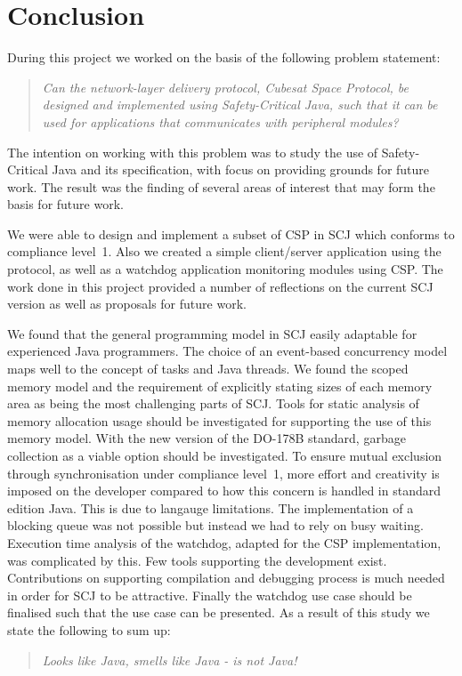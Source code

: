 \chapter{Conclusion}
\label{chapter:Conclusion}
During this project we worked on the basis of the following problem statement:
\begin{quotation}
	\textit{Can the network-layer delivery protocol, Cubesat Space Protocol, be designed and implemented using Safety-Critical Java, such that it can be used for applications that communicates with peripheral modules?}
\end{quotation}
The intention on working with this problem was to study the use of Safety-Critical Java and its specification, with focus on providing grounds for future work. The result was the finding of several areas of interest that may form the basis for future work.

We were able to design and implement a subset of CSP in SCJ which conforms to compliance level~1. Also we created a simple client/server application using the protocol, as well as a watchdog application monitoring modules using CSP. The work done in this project provided a number of reflections on the current SCJ version as well as proposals for future work.

We found that the general programming model in SCJ easily adaptable for experienced Java programmers. The choice of an event-based concurrency model maps well to the concept of tasks and Java threads. We found the scoped memory model and the requirement of explicitly stating sizes of each memory area as being the most challenging parts of SCJ. Tools for static analysis of memory allocation usage should be investigated for supporting the use of this memory model. With the new version of the DO-178B standard, garbage collection as a viable option should be investigated. To ensure mutual exclusion through synchronisation under compliance level~1, more effort and creativity is imposed on the developer compared to how this concern is handled in standard edition Java. This is due to langauge limitations. The implementation of a blocking queue was not possible but instead we had to rely on busy waiting. Execution time analysis of the watchdog, adapted for the CSP implementation, was complicated by this. Few tools supporting the development exist. Contributions on supporting compilation and debugging process is much needed in order for SCJ to be attractive. Finally the watchdog use case should be finalised such that the use case can be presented. As a result of this study we state the following to sum up: 
\begin{quotation}
\centering
	\textit{Looks like Java, smells like Java - is not Java!}
\end{quotation}